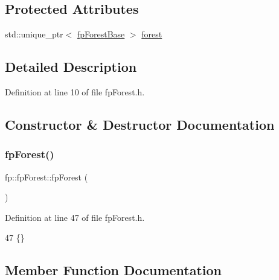 \subsection*{Protected Attributes}
\begin{DoxyCompactItemize}
\item 
std\+::unique\+\_\+ptr$<$ \hyperlink{classfp_1_1fpForestBase}{fp\+Forest\+Base} $>$ \hyperlink{classfp_1_1fpForest_a4ce6af867d36c8d62c860db8982235c4}{forest}
\end{DoxyCompactItemize}


\subsection{Detailed Description}


Definition at line 10 of file fp\+Forest.\+h.



\subsection{Constructor \& Destructor Documentation}
\mbox{\label{classfp_1_1fpForest_a24525268a1b59f78f687db1e0f609a59}} 
\subsubsection{\texorpdfstring{fp\+Forest()}{fpForest()}}
{\footnotesize\ttfamily fp\+::fp\+Forest\+::fp\+Forest (\begin{DoxyParamCaption}{ }\end{DoxyParamCaption})\hspace{0.3cm}{\ttfamily [inline]}}



Definition at line 47 of file fp\+Forest.\+h.


\begin{DoxyCode}
47 \{\}
\end{DoxyCode}


\subsection{Member Function Documentation}
\mbox{\label{classfp_1_1fpForest_a598d32c816dfe5f9793973dcdff2f76e}} 
